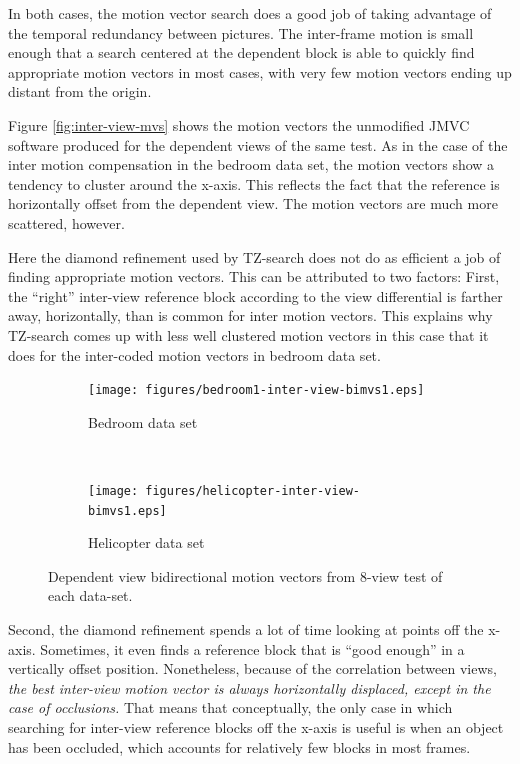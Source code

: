 \documentclass{sig-alternate-05-2015}
\begin{document}
In both cases, the motion vector search does a good job of taking advantage of
the temporal redundancy between pictures. The inter-frame motion is small enough
that a search centered at the dependent block is able to quickly find appropriate
motion vectors in most cases, with very few motion vectors ending up distant from
the origin.

Figure \ref{fig:inter-view-mvs} shows the motion vectors the unmodified JMVC
software produced for the dependent views of the same test. As in the case
of the inter motion compensation in the bedroom data set, the motion vectors
show a tendency to cluster around the x-axis. This reflects the fact that the
reference is horizontally offset from the dependent view. The motion vectors
are much more scattered, however.

Here the diamond refinement used by TZ-search does not do as efficient a job of
finding appropriate motion vectors. This can be attributed to two factors:
First, the ``right'' inter-view reference block according to the view
differential is farther away, horizontally, than is common for inter motion
vectors. This explains why TZ-search comes up with less well clustered motion
vectors in this case that it does for the inter-coded motion vectors in
bedroom data set.

\begin{figure}[H]
\centering
\begin{subfigure}{.5\textwidth}
\centering
\texttt{[image: figures/bedroom1-inter-view-bimvs1.eps]}
\caption{Bedroom data set}
\label{fig:bedroom-inter-view-bimvs1}
\end{subfigure} \\
\begin{subfigure}{.5\textwidth}
\centering
\texttt{[image: figures/helicopter-inter-view-bimvs1.eps]}
\caption{Helicopter data set}
\label{fig:helicopter-inter-view-bimvs1}
\end{subfigure}
\caption{Dependent view bidirectional motion vectors from 8-view test of each
data-set.}
\label{fig:inter-view-bimvs1}
\end{figure}

\newpage
Second, the diamond refinement spends a lot of time looking at points off
the x-axis. Sometimes, it even finds a reference block that is ``good enough''
in a vertically offset position. Nonetheless, because of the correlation between
views, {\it the best inter-view motion vector is always horizontally displaced,
except in the case of occlusions.} That means that conceptually, the only case in
which searching for inter-view reference blocks off the x-axis is useful is when
an object has been occluded, which accounts for relatively few blocks in most
frames.
\end{document}
